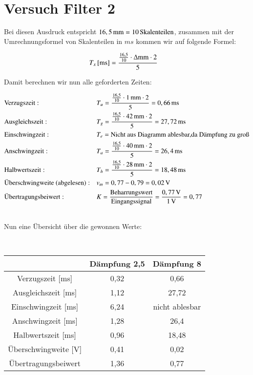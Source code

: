 \section{Versuch Filter 2}

Bei diesen Ausdruck entspricht $\unit[16,5]{mm} = \unit[10]{Skalenteilen}$, zusammen mit der Umrechnungsformel von Skalenteilen in $ms$ kommen wir auf folgende Formel:

\begin{align*}
\unit[T_x]{[ms]} &= \frac{ \frac{16,5}{10} \cdot \Delta \text{mm} \cdot 2}{5}
\end{align*}

Damit berechnen wir nun alle geforderten Zeiten:

\begin{align*}
&\text{Verzugszeit}:  &&T_u = \frac{ \frac{16,5}{10} \cdot \unit[1]{mm} \cdot 2}{5} = \unit[0,66]{ms} \\
&\text{Ausgleichszeit}:  &&T_g = \frac{ \frac{16,5}{10} \cdot \unit[42]{mm} \cdot 2}{5} = \unit[27,72]{ms} \\
&\text{Einschwingzeit}:  &&T_e = \text{Nicht aus Diagramm ablesbar,da Dämpfung zu groß} \\
&\text{Anschwingzeit}:  &&T_a = \frac{ \frac{16,5}{10} \cdot \unit[40]{mm} \cdot 2}{5} = \unit[26,4]{ms} \\
&\text{Halbwertszeit}:  &&T_h = \frac{ \frac{16,5}{10} \cdot \unit[28]{mm} \cdot 2}{5} = \unit[18,48]{ms} \\
&\text{Überschwingweite (abgelesen)}:  &&v_m = 0,77 - 0,79 = \unit[0,02]{V} \\
&\text{Übertragungsbeiwert}:  &&K = \frac{\text{Beharrungswert}}{\text{Eingangssignal}} = \frac{\unit[0,77]{V}}{\unit[1]{V}} = \unit[0,77]{ } \\
\end{align*}

\hfill \\

Nun eine Übersicht über die gewonnen Werte:

\hfill \\

\begin{tabular}{c|c|c}
 & Dämpfung 2,5 & Dämpfung 8 \\ 
\hline 
Verzugszeit [ms] & 0,32 & 0,66 \\ 
\hline 
Ausgleichszeit [ms] & 1,12 & 27,72 \\ 
\hline 
Einschwingzeit [ms] & 6,24 & nicht ablesbar \\ 
\hline 
Anschwingzeit [ms] & 1,28 & 26,4 \\ 
\hline 
Halbwertszeit [ms] & 0,96 & 18,48 \\ 
\hline 
Überschwingweite [V] & 0,41 & 0,02 \\ 
\hline 
Übertragungsbeiwert & 1,36 & 0,77 \\ 
\end{tabular} 



